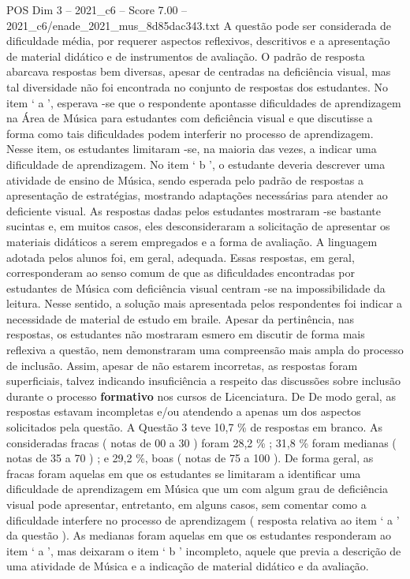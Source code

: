 \begin{textsample}{POS Dim 3 – 2021\_c6 – Score 7.00 – 2021\_c6/enade\_2021\_mus\_8d85dac343.txt}
A questão pode ser considerada de dificuldade média, por requerer aspectos reflexivos, descritivos e a apresentação de material didático e de instrumentos de avaliação.
O padrão de resposta abarcava respostas bem diversas, apesar de centradas na deficiência visual, mas tal diversidade não foi encontrada no conjunto de respostas dos estudantes.
No item ‘ a ’, esperava -se que o respondente apontasse dificuldades de aprendizagem na Área de Música para estudantes com deficiência visual e que discutisse a forma como tais dificuldades podem interferir no processo de aprendizagem.
Nesse item, os estudantes limitaram -se, na maioria das vezes, a indicar uma dificuldade de aprendizagem.
No item ‘ b ’, o estudante deveria descrever uma atividade de ensino de Música, sendo esperada pelo padrão de respostas a apresentação de estratégias, mostrando adaptações necessárias para atender ao deficiente visual.
As respostas dadas pelos estudantes mostraram -se bastante sucintas e, em muitos casos, eles desconsideraram a solicitação de apresentar os materiais didáticos a serem empregados e a forma de avaliação.
A linguagem adotada pelos alunos foi, em geral, adequada.
Essas respostas, em geral, corresponderam ao senso comum de que as dificuldades encontradas por estudantes de Música com deficiência visual centram -se na impossibilidade da leitura.
Nesse sentido, a solução mais apresentada pelos respondentes foi indicar a necessidade de material de estudo em braile.
Apesar da pertinência, nas respostas, os estudantes não mostraram esmero em discutir de forma mais reflexiva a questão, nem demonstraram uma compreensão mais ampla do processo de inclusão.
Assim, apesar de não estarem incorretas, as respostas foram superficiais, talvez indicando insuficiência a respeito das discussões sobre inclusão durante o processo \textbf{formativo} nos cursos de Licenciatura.
De De modo geral, as respostas estavam incompletas e/ou atendendo a apenas um dos aspectos solicitados pela questão.
A Questão 3 teve 10,7 \% de respostas em branco.
As consideradas fracas ( notas de 00 a 30 ) foram 28,2 \% ; 31,8 \% foram medianas ( notas de 35 a 70 ) ; e 29,2 \%, boas ( notas de 75 a 100 ).
De forma geral, as fracas foram aquelas em que os estudantes se limitaram a identificar uma dificuldade de aprendizagem em Música que um com algum grau de deficiência visual pode apresentar, entretanto, em alguns casos, sem comentar como a dificuldade interfere no processo de aprendizagem ( resposta relativa ao item ‘ a ’ da questão ).
As medianas foram aquelas em que os estudantes responderam ao item ‘ a ’, mas deixaram o item ‘ b ’ incompleto, aquele que previa a descrição de uma atividade de Música e a indicação de material didático e da avaliação.

\end{textsample}
